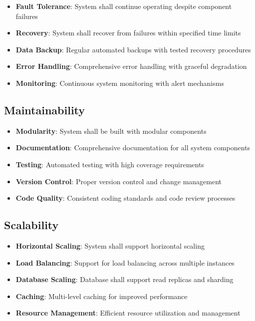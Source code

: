 \documentclass[12pt,a4paper]{article}
\begin{document}
\begin{itemize}
    \item \textbf{Fault Tolerance}: System shall continue operating despite component failures
    \item \textbf{Recovery}: System shall recover from failures within specified time limits
    \item \textbf{Data Backup}: Regular automated backups with tested recovery procedures
    \item \textbf{Error Handling}: Comprehensive error handling with graceful degradation
    \item \textbf{Monitoring}: Continuous system monitoring with alert mechanisms
\end{itemize}

\subsection{Maintainability}

\begin{itemize}
    \item \textbf{Modularity}: System shall be built with modular components
    \item \textbf{Documentation}: Comprehensive documentation for all system components
    \item \textbf{Testing}: Automated testing with high coverage requirements
    \item \textbf{Version Control}: Proper version control and change management
    \item \textbf{Code Quality}: Consistent coding standards and code review processes
\end{itemize}

\subsection{Scalability}

\begin{itemize}
    \item \textbf{Horizontal Scaling}: System shall support horizontal scaling
    \item \textbf{Load Balancing}: Support for load balancing across multiple instances
    \item \textbf{Database Scaling}: Database shall support read replicas and sharding
    \item \textbf{Caching}: Multi-level caching for improved performance
    \item \textbf{Resource Management}: Efficient resource utilization and management
\end{itemize}
\end{document}

